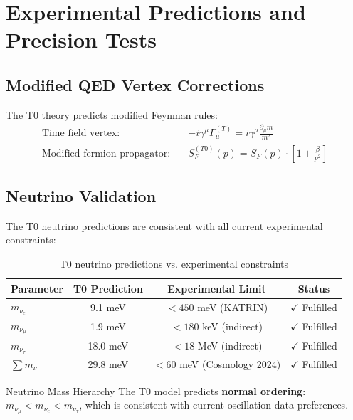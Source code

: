 	\section{Experimental Predictions and Precision Tests}
	\label{sec:experimental_predictions}

	\subsection{Modified QED Vertex Corrections}
	\label{subsec:qed_corrections}
	
	The T0 theory predicts modified Feynman rules:
	\begin{align}
		\text{Time field vertex:} \quad &-i\gamma^\mu\Gamma_\mu^{(T)} = i\gamma^\mu\frac{\partial_\mu m}{m^2} \\
		\text{Modified fermion propagator:} \quad &S_F^{(T0)}(p) = S_F(p) \cdot \left[1 + \frac{\beta}{p^2}\right]
	\end{align}
	
	\subsection{Neutrino Validation}
	\label{subsec:neutrino_validation}
	
	The T0 neutrino predictions are consistent with all current experimental constraints:
	
	\begin{table}[H]
		\centering
		\begin{tabular}{lccc}
			\toprule
			\textbf{Parameter} & \textbf{T0 Prediction} & \textbf{Experimental Limit} & \textbf{Status} \\
			\midrule
			$m_{\nu_e}$ & 9.1 meV & $< 450$ meV (KATRIN) & $\checkmark$ Fulfilled \\
			$m_{\nu_\mu}$ & 1.9 meV & $< 180$ keV (indirect) & $\checkmark$ Fulfilled \\
			$m_{\nu_\tau}$ & 18.0 meV & $< 18$ MeV (indirect) & $\checkmark$ Fulfilled \\
			$\sum m_\nu$ & 29.8 meV & $< 60$ meV (Cosmology 2024) & $\checkmark$ Fulfilled \\
			\bottomrule
		\end{tabular}
		\caption{T0 neutrino predictions vs. experimental constraints}
		\label{tab:neutrino_validation}
	\end{table}
	
	\begin{important}{Neutrino Mass Hierarchy}{}
		The T0 model predicts \textbf{normal ordering}: $m_{\nu_\mu} < m_{\nu_e} < m_{\nu_\tau}$, which is consistent with current oscillation data preferences.
	\end{important}
	
